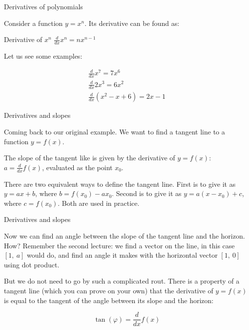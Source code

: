 \documentclass{beamer}
\begin{document}
\begin{frame}{Derivatives of polynomials}
	\begin{flushleft}
		
		Consider a function $y = x^n$. Its derivative can be found as:
		
		\begin{block}{Derivative of $x^n$}
			$\frac{d}{dx}  x^n = n x^{n-1}$
		\end{block}
	
	\bigskip
		
		Let us see some examples:
		
		\begin{align}
			\frac{d}{dx}  x^7 = 7 x^6 \\
			\frac{d}{dx}  2 x^3 = 6 x^2 \\
			\frac{d}{dx}  (x^2 - x + 6) = 2x - 1
		\end{align}
		
		
	\end{flushleft}
\end{frame}


\begin{frame}{Derivatives and slopes}
	\begin{flushleft}
		
		Coming back to our original example. We want to find a tangent line to a function $y = f(x)$.
		
		\bigskip
		
		The slope of the tangent like is given by the derivative of  $y = f(x)$: $a = \frac{d}{dx} f(x)$, evaluated as the point $x_0$.
		
		\bigskip
		
		There are two equivalent ways to define the tangent line. First is to give it as $y = ax + b$, where $b = f(x_0) - a x_0$. Second is to give it as $y = a (x - x_0) + c$, where $c =  f(x_0)$. Both are used in practice.
		
	\end{flushleft}
\end{frame}


\begin{frame}{Derivatives and slopes}
	\begin{flushleft}
		
		Now we can find an angle between the slope of the tangent line and the horizon. How? Remember the second lecture: we find a vector on the line, in this case $[1, \ a]$ would do, and find an angle it makes with the horizontal vector $[1, \ 0]$ using dot product.
		
		\bigskip
		
		But we do not need to go by such a complicated rout. There is a property of a tangent line (which you can prove on your own) that the derivative of $y = f(x)$ is equal to the tangent of the angle between its slope and the horizon:
		
		\begin{equation}
			\tan (\varphi) = \frac{d}{dx} f(x)
		\end{equation}
		
	\end{flushleft}
\end{frame}
\end{document}
